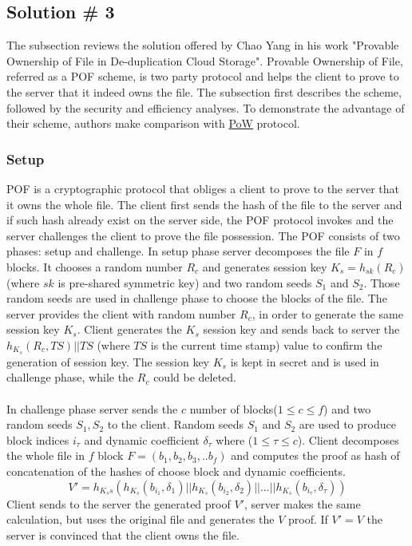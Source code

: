 \documentclass[12pt]{article}
\begin{document}
\subsection{Solution \# 3}
\label{sub:Soltuion3}
The subsection reviews the solution offered by Chao Yang in his work "Provable Ownership of File in De-duplication Cloud Storage".\cite{POF} Provable Ownership of File, referred as a POF scheme, is two party protocol and helps the client to prove to the server that it indeed owns the file. The subsection first describes the scheme, followed by the security and efficiency analyses. To demonstrate the  advantage of their scheme,  authors make comparison with \hyperref[sub:Soltuion1]{PoW} protocol.

\subsubsection{Setup}
\label{subsub:setup3}

POF is a cryptographic protocol that obliges a client to prove to the server that it owns the whole file. The client first sends the hash of the file to the server and if such hash already exist on the server side, the POF protocol invokes and the server challenges the client to prove the file possession. The POF consists of two phases: setup and challenge. In setup phase server decomposes the file $F$ in $f$ blocks. It chooses a random number  $R_c$  and generates session key $K_s = h_{sk}(R_c)$ (where $sk$ is pre-shared symmetric key) and two random seeds $S_1$ and $S_2$. Those random seeds are used in challenge phase to choose the blocks of the  file. The server provides the client with random number $R_c$, in order to generate the same session key $K_s$. Client generates the $K_s$ session key and  sends back to server the $h_{K_s}(R_c, TS)||TS$ (where $TS$ is the current time stamp) value to confirm the generation of session key.  The session key $K_s$ is kept in secret and is used in challenge phase, while the $R_c$ could be deleted.\\\\
In challenge phase server sends the $c$ number of blocks($1 \leqslant c \leqslant f $) and two random seeds $S_1,S_2$ to the client. Random seeds $S_1$ and $S_2$ are used to produce block indices $i_\tau$ and dynamic coefficient $\delta_\tau$  where ($1 \leqslant \tau \leqslant c$). Client decomposes the whole  file in $f$ block $F=(b_1,b_2,b_3,..b_f)$ and computes the proof as hash of concatenation of the hashes of choose block and dynamic coefficients. 
\begin{equation}\label{1}
V' = h_{K_ss}(h_{K_s}(b_{i_1},\delta_1)||h_{K_s}(b_{i_2},\delta_2)|| ...||h_{K_s}(b_{i_\tau},\delta_\tau)) 
\end{equation}
Client sends to the server the generated proof $V'$, server makes the same calculation, but uses the original file and generates the $V$ proof. If $V'=V$ the server is convinced that the client  owns the file. 
 
\end{document}
